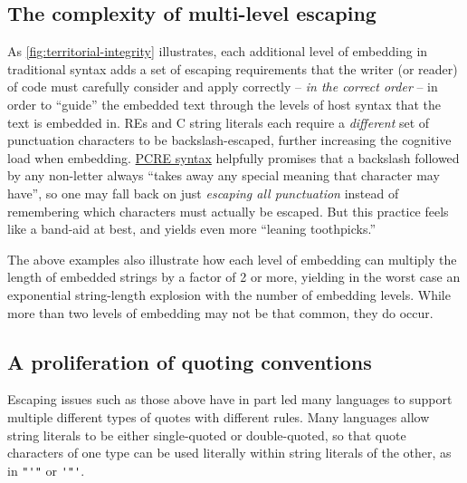\subsection{The complexity of multi-level escaping}

As \cref{fig:territorial-integrity} illustrates,
each additional level of embedding in traditional syntax
adds a set of escaping requirements that the writer (or reader) of code
must carefully consider and apply correctly --
\emph{in the correct order} --
in order to ``guide'' the embedded text
through the levels of host syntax that the text is embedded in.
REs and C string literals each require
a \emph{different} set of punctuation characters to be backslash-escaped,
further increasing the cognitive load when embedding.
\href{https://www.pcre.org/original/doc/html/pcrepattern.html}{PCRE syntax}
helpfully promises that a backslash followed by any non-letter
always ``takes away any special meaning that character may have'',
so one may fall back on just \emph{escaping all punctuation}
instead of remembering which characters must actually be escaped.
But this practice feels like a band-aid at best,
and yields even more ``leaning toothpicks.''

The above examples also illustrate how each level of embedding
can multiply the length of embedded strings by a factor of 2 or more,
yielding in the worst case
an exponential string-length explosion with the number of embedding levels.
While more than two levels of embedding may not be that common,
they do occur.


\subsection{A proliferation of quoting conventions}

Escaping issues such as those above have in part led many languages
to support multiple different types of quotes with different rules.
Many languages allow string literals
to be either single-quoted or double-quoted,
so that quote characters of one type can be used literally
within string literals of the other,
as in \verb|"'"| or \verb|'"'|.


